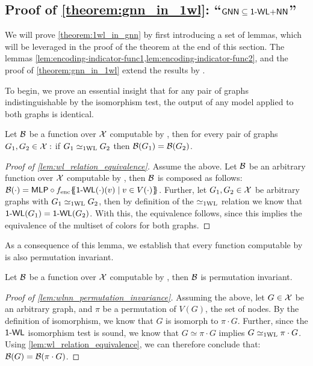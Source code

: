 \subsection{Proof of \cref*{theorem:gnn_in_1wl}: ``$\textsf{GNN} \subseteq \text{\textsf{1-WL+NN}}$''}\label{sec:proof_theorem:1wl_in_gnn}
We will prove \cref{theorem:1wl_in_gnn} by first introducing a set of lemmas, which will be leveraged in the proof of the theorem at the end of this section. The lemmas \cref{lem:encoding-indicator-func1,lem:encoding-indicator-func2}, and the proof of \cref{theorem:gnn_in_1wl} extend the results by \cite{Chen2019}.

To begin, we prove an essential insight that for any pair of graphs indistinguishable by the \wl isomorphism test, the output of any \wlnn model applied to both graphs is identical.
\begin{lemma}\label{lem:wl_relation_equivalence}
    Let $\mathcal{B}$ be a function over $\mathcal{X}$ computable by \wlnn, then for every pair of graphs $G_1, G_2 \in \mathcal{X}:$ if $G_1 \simeq_{\text{1WL}} G_2$ then $\mathcal{B}(G_1) = \mathcal{B}(G_2)$.
\end{lemma}
\begin{proof}[Proof of \cref{lem:wl_relation_equivalence}]
    Assume the above. Let $\mathcal{B}$ be an arbitrary function over $\mathcal{X}$ computable by \wlnn, then $\mathcal{B}$ is composed as follows: $\mathcal{B}(\cdot) = \textsf{MLP} \circ f_{\text{enc}} \{\!\!\{ \textsf{1-WL}(\cdot)(v) \mid v \in V(\cdot) \}\!\!\}$. Further, let $G_1, G_2 \in \mathcal{X}$ be arbitrary graphs with $G_1 \simeq_{\text{1WL}} G_2$, then by definition of the $\simeq_{\text{1WL}}$ relation we know that $\textsf{1-WL}(G_1) = \textsf{1-WL}(G_2)$. With this, the equivalence follows, since this implies the equivalence of the multiset of colors for both graphs.
\end{proof}

As a consequence of this lemma, we establish that every function computable by \wlnn is also permutation invariant.
\begin{corollary}\label{lem:wlnn_permutation_invariance}
    Let $\mathcal{B}$ be a function over $\mathcal{X}$ computable by \wlnn, then $\mathcal{B}$ is permutation invariant.
\end{corollary}

\begin{proof}[Proof of \cref{lem:wlnn_permutation_invariance}]
    Assuming the above, let $G \in \mathcal{X}$ be an arbitrary graph, and $\pi$ be a permutation of $V(G)$, the set of nodes. By the definition of isomorphism, we know that $G$ is isomorph to $\pi \cdot G$. Further, since the $\textsf{1-WL}$ isomorphism test is sound, we know that $G \simeq \pi \cdot G$ implies $G \simeq_{\text{1WL}} \pi \cdot G$. Using \cref{lem:wl_relation_equivalence}, we can therefore conclude that: $\mathcal{B}(G) = \mathcal{B}(\pi \cdot G)$.
\end{proof}

